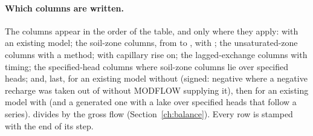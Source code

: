 \paragraph{Which columns are written.} The columns appear in the order of the table, and only where they apply:
 with an existing model; the soil-zone columns, from  to , with ; the unsaturated-zone columns with a
 method;  with capillary rise on; the lagged-exchange columns
with  timing; the specified-head columns where soil-zone columns lie over specified heads; and, last,
 for an existing model without  (signed: negative where a negative recharge
was taken out of  without MODFLOW supplying it), then  for an
existing model with  (and a generated one with a lake over specified heads that follow a
 series).  divides by the gross flow
(Section~\ref{ch:balance}). Every row is stamped with the end of its step.

